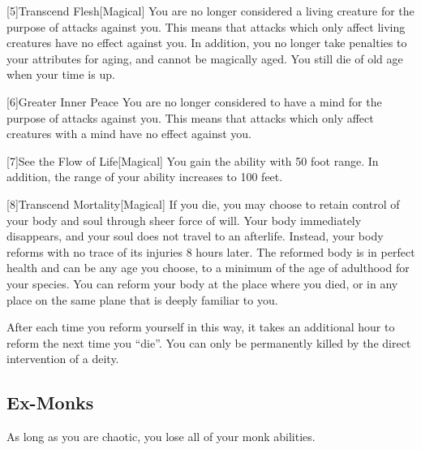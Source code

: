         [5]{Transcend Flesh}[Magical]
        You are no longer considered a living creature for the purpose of attacks against you.
        This means that attacks which only affect living creatures have no effect against you.
        In addition, you no longer take penalties to your attributes for aging, and cannot be magically aged.
        You still die of old age when your time is up.

        [6]{Greater Inner Peace}
        You are no longer considered to have a mind for the purpose of attacks against you.
        This means that attacks which only affect creatures with a mind have no effect against you.

        [7]{See the Flow of Life}[Magical]
        You gain the  ability with 50 foot range.
        In addition, the range of your  ability increases to 100 feet.

        [8]{Transcend Mortality}[Magical]
        If you die, you may choose to retain control of your body and soul through sheer force of will.
        Your body immediately disappears, and your soul does not travel to an afterlife.
        Instead, your body reforms with no trace of its injuries 8 hours later.
        The reformed body is in perfect health and can be any age you choose, to a minimum of the age of adulthood for your species.
        You can reform your body at the place where you died, or in any place on the same plane that is deeply familiar to you.

        After each time you reform yourself in this way, it takes an additional hour to reform the next time you ``die''.
        You can only be permanently killed by the direct intervention of a deity.

    \subsection{Ex-Monks}
        As long as you are chaotic, you lose all of your  monk abilities.

\newpage

